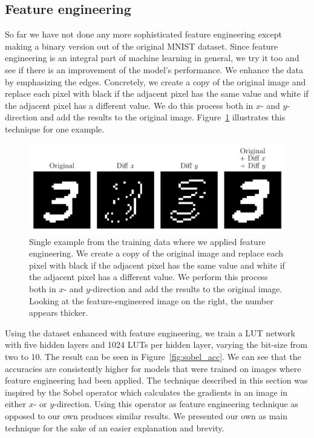 \subsection{Feature engineering} \label{sec:feature_engineering}
So far we have not done any more sophisticated feature engineering except making a binary version out of the original MNIST dataset. Since feature engineering is an integral part of machine learning in general, we try it too and see if there is an improvement of the model's performance. We enhance the data by emphasizing the edges. Concretely, we create a copy of the original image and replace each pixel with black if the adjacent pixel has the same value and white if the adjacent pixel has a different value. We do this process both in $x$- and $y$-direction and add the results to the original image. Figure~\ref{fig:sobel_single} illustrates this technique for one example.

\begin{figure}[!htb]
    \centering
    \includegraphics[width=.9\linewidth]{images/diff.pdf}
    \caption{Single example from the training data where we applied feature engineering. We create a copy of the original image and replace each pixel with black if the adjacent pixel has the same value and white if the adjacent pixel has a different value. We perform this process both in $x$- and $y$-direction and add the results to the original image. Looking at the feature-engineered image on the right, the number appears thicker.}
\label{fig:sobel_single}
\end{figure}
\FloatBarrier

\noindent Using the dataset enhanced with feature engineering, we train a LUT network with five hidden layers and 1024 LUTs per hidden layer, varying the bit-size from two to 10. The result can be seen in Figure~\ref{fig:sobel_acc}. We can see that the accuracies are consistently higher for models that were trained on images where feature engineering had been applied. The technique described in this section was inspired by the Sobel operator \cite{bib:sobelsobel} which calculates the gradients in an image in either $x$- or $y$-direction. Using this operator as feature engineering technique as opposed to our own produces similar results. We presented our own as main technique for the sake of an easier explanation and brevity.

